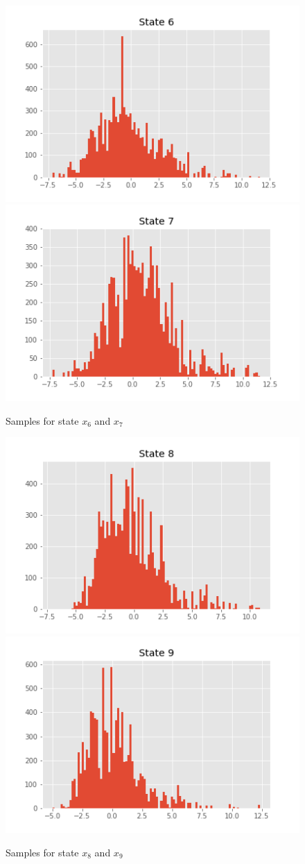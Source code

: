\documentclass[]{article}
\begin{document}
\begin{figure}[H]
	\begin{center}
	
		\includegraphics[width=.4\textwidth]{task2/figures/T_2_2/Q2/plt_x6.png}
		\includegraphics[width=.4\textwidth]{task2/figures/T_2_2/Q2/plt_x7.png}
		
		\caption*{Samples for state $x_6$ and $x_7$}
		\end{center}
\end{figure}
\begin{figure}[H]
	\begin{center}
	
		\includegraphics[width=.4\textwidth]{task2/figures/T_2_2/Q2/plt_x8.png}
		\includegraphics[width=.4\textwidth]{task2/figures/T_2_2/Q2/plt_x9.png}
		
		\caption*{Samples for state $x_8$ and $x_9$}
		\end{center}
\end{figure}
\end{document}
